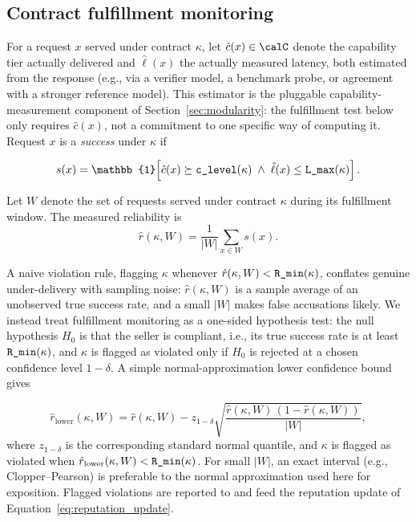 \subsection{Contract fulfillment monitoring}
\label{sec:fulfillment_monitoring}

For a request $x$ served under contract $\kappa$, let $\hat c(x) \in
\calC$ denote the capability tier actually delivered and $\hat\ell(x)$ the
actually measured latency, both estimated from the response (e.g., via a
verifier model, a benchmark probe, or agreement with a stronger reference
model). This estimator is the pluggable capability-measurement component
of Section~\ref{sec:modularity}: the fulfillment test below only requires
$\hat c(x)$, not a commitment to one specific way of computing it. Request
$x$ is a \emph{success} under $\kappa$ if

\begin{equation}
  \label{eq:success_indicator}
  s(x) = \mathbb{1}\!\left[
    \hat c(x) \succeq \clevelattr(\kappa)
    \;\wedge\;
    \hat\ell(x) \leq \lmaxattr(\kappa)
  \right].
\end{equation}

\begin{definition}
\label{def:measured_reliability}
Let $W$ denote the set of requests served under contract $\kappa$ during
its fulfillment window. The measured reliability is
\begin{equation}
  \label{eq:measured_reliability}
  \hat r(\kappa, W) = \frac{1}{|W|} \sum_{x \in W} s(x).
\end{equation}
\end{definition}

A naive violation rule, flagging $\kappa$ whenever
$\hat r(\kappa, W) < \textnormal{\texttt{R\_min}}(\kappa)$, conflates genuine under-delivery
with sampling noise: $\hat r(\kappa, W)$ is a sample average of an
unobserved true success rate, and a small $|W|$ makes false accusations
likely. We instead treat fulfillment monitoring as a one-sided hypothesis
test: the null hypothesis $H_0$ is that the seller is compliant, i.e., its
true success rate is at least $\textnormal{\texttt{R\_min}}(\kappa)$, and $\kappa$ is flagged
as violated only if $H_0$ is rejected at a chosen confidence level
$1 - \delta$. A simple normal-approximation lower confidence bound gives

\begin{equation}
  \label{eq:reliability_lower_bound}
  \hat r_{\text{lower}}(\kappa, W)
  = \hat r(\kappa, W)
  - z_{1 - \delta}
    \sqrt{
      \frac{\hat r(\kappa, W) \, (1 - \hat r(\kappa, W))}{|W|}
    },
\end{equation}
where $z_{1 - \delta}$ is the corresponding standard normal quantile, and
$\kappa$ is flagged as violated when
$\hat r_{\text{lower}}(\kappa, W) < \textnormal{\texttt{R\_min}}(\kappa)$. For small $|W|$, an
exact interval (e.g., Clopper--Pearson) is preferable to the normal
approximation used here for exposition. Flagged violations are reported
to \NoesisMarket{} and feed the reputation update of
Equation~\eqref{eq:reputation_update}.

